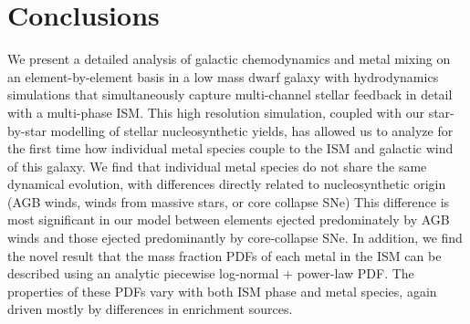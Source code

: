 \documentclass[twocolumn]{aastex61}
\begin{document}

\section{Conclusions}
\label{sec:conclusions}
We present a detailed analysis of galactic chemodynamics and metal mixing on an element-by-element basis in a low mass dwarf galaxy with hydrodynamics simulations that simultaneously capture multi-channel stellar feedback in detail with a multi-phase ISM. This high resolution simulation, coupled with our star-by-star modelling of stellar nucleosynthetic yields, has allowed us to analyze
      for the first time
how individual metal species couple to the ISM and galactic wind of this galaxy. We find that individual metal species do not share the same dynamical evolution, with differences directly related to nucleosynthetic origin (AGB winds, winds from massive stars, or core collapse SNe)
This difference is most significant in our model between elements ejected predominately by AGB winds and those ejected predominantly by core-collapse SNe. In addition, we find 
    the novel result
that the mass fraction PDFs of each metal in the ISM can be described using an analytic piecewise log-normal + power-law PDF. The properties of these PDFs vary with both ISM phase and metal species, again driven mostly by differences in enrichment sources.
\end{document}
